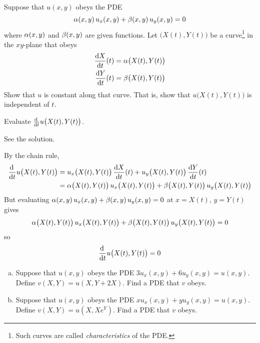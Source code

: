 \begin{question}
Suppose that $u(x,y)$ obeys the PDE
\begin{equation*}
\alpha(x,y)\,u_x(x,y) +\beta(x,y)\,u_y(x,y)=0
\end{equation*}
where $\alpha(x,y)$ and $\beta(x,y)$ are given functions. Let $\big(X(t),Y(t)\big)$
be a curve\footnote{Such curves are called \emph{characteristics} of the PDE.} in the $xy$-plane that obeys
\begin{align*}
\diff{X}{t}(t)&=\al\big(X(t),Y(t)\big) \\
\diff{Y}{t}(t)&=\be\big(X(t),Y(t)\big) 
\end{align*}
Show that $u$ is constant along that curve. That is, show that $u\big(X(t),Y(t)\big)$ is independent of $t$. 
\end{question}

\begin{hint}
Evaluate $\diff{}{t}u\big(X(t),Y(t)\big)$.
\end{hint}

\begin{answer}
See the solution.
\end{answer}

\begin{solution}
By the chain rule,
\begin{align*}
\diff{}{t}u\big(X(t),Y(t)\big)
&=u_x\big(X(t),Y(t)\big)\,\diff{X}{t}(t)
  +u_y\big(X(t),Y(t)\big)\,\diff{Y}{t}(t) \\
&=\al\big(X(t),Y(t)\big)\, u_x\big(X(t),Y(t)\big)
  +\be\big(X(t),Y(t)\big)\, u_y\big(X(t),Y(t)\big)
\end{align*}
But evaluating $\alpha(x,y)\,u_x(x,y) +\beta(x,y)\,u_y(x,y)=0$ at $x=X(t)$, 
$y=Y(t)$ gives
\begin{equation*}
\alpha\big(X(t),Y(t)\big)\, u_x\big(X(t),Y(t)\big)
  +\beta\big(X(t),Y(t)\big)\, u_y\big(X(t),Y(t)\big)
   =0
\end{equation*}
so
\begin{equation*}
\diff{}{t}u\big(X(t),Y(t)\big)=0
\end{equation*}
\end{solution}



\begin{question}
\begin{enumerate}[(a)]
\item 
Suppose that $u(x,y)$ obeys the PDE $3u_x(x,y) + 6u_y(x,y)=u(x,y)$. Define
$v(X,Y) = u(X, Y+2X)$. Find a PDE that $v$ obeys.

\item 
Suppose that $u(x,y)$ obeys the PDE $xu_x(x,y) + yu_y(x,y)=u(x,y)$. Define
$v(X,Y) = u(X, Xe^Y)$. Find a PDE that $v$ obeys.
\end{enumerate}
 
\end{question}

